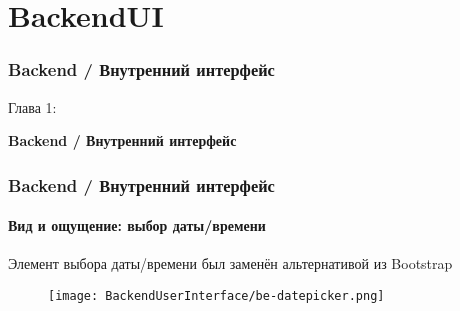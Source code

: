 %

\section{BackendUI}
\begin{frame}[fragile]
	\frametitle{Backend / Внутренний интерфейс}

	\begin{center}\huge{Глава 1:}\end{center}
	\begin{center}\huge{\color{typo3darkgrey}\textbf{Backend / Внутренний интерфейс}}\end{center}

\end{frame}


\begin{frame}[fragile]
	\frametitle{Backend / Внутренний интерфейс}
	\framesubtitle{Вид и ощущение: выбор даты/времени}

	Элемент выбора даты/времени был заменён альтернативой из Bootstrap
	\begin{figure}
		\texttt{[image: BackendUserInterface/be-datepicker.png]}
	\end{figure}

\end{frame}



